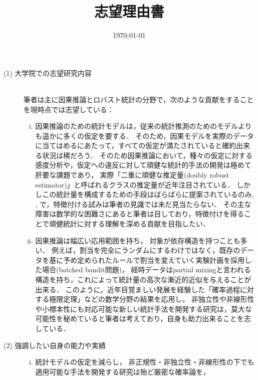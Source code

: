 \documentclass[uplatex, dvipdfmx]{jsarticle}
\title{志望理由書}
\date{\today}
\begin{document}
\begin{description}
    \item[(1) 大学院での志望研究内容] \mbox{}\\
    筆者は主に因果推論とロバスト統計の分野で，次のような貢献をすることを現時点では志望している：
    \vspace{1em}
    \begin{enumerate}[(i)]
        \item 因果推論のための統計モデルは，従来の統計推測のためのモデルよりも遥かに多くの仮定を要する．
        そのため，因果モデルを実際のデータに当てはめるにあたって，すべての仮定が満たされていると確約出来る状況は稀だろう．
        そのため因果推論において，種々の仮定に対する感度分析や，仮定への違反に対して頑健な統計的手法の開発は極めて肝要な課題であり，
        実際「二重に頑健な推定量(doubly robust estimator)」と呼ばれるクラスの推定量が近年注目されている\cite{Robins-Rotnitzky01-Comments}．
        しかしこの統計量を構成するための手段はばらばらに提案されているのみ\cite{Chernozhukov-Ichimura-Newey22-LocallyRobust}, \cite{Rotnitzky-Smucler-Robins21-MixedBiasProperty}, \cite{Chernozhukov-Newey-Singh22-DebiasedMachineLearning}で，特徴付ける試みは筆者の見識では未だ見当たらない．
        その主な障害は数学的な困難さにあると筆者は目しており，特徴付けを得ることで頑健統計に対する理解を深める貢献を目指したい．\vspace{1em}
        \item 因果推論は幅広い応用範囲を持ち，
        対象が依存構造を持つことも多い．
        例えば，割当を完全にランダムにするわけではなく，既存のデータを基に予め定められたルールで割当を変えていく実験計画を採用した場合(batched bandit問題)，
        経時データはpartial mixingと言われる構造を持ち\cite{YechanPark-Zhan-Yoshida22}，これによって統計量の高次な漸近的近似を与えることが出来る．
        このように，近年目覚ましい発展を経験した「確率過程に対する極限定理」などの数学分野の結果を応用し，
        非独立性や非線形性や小標本性にも対応可能な新しい統計手法を開発する研究は，莫大な可能性を秘めていると筆者は考えており，自身も助力出来ることを志している．
    \end{enumerate}\vspace{1em}
    \item[(2) 強調したい自身の能力や実績] \mbox{}\vspace{1em}
    \begin{enumerate}[(i)]
        \item 統計モデルの仮定を減らし，
        非正規性・非独立性・非線形性の下でも適用可能な手法を開発する研究は殆ど厳密な確率論を，

\end{enumerate}
\end{description}
\end{document}
